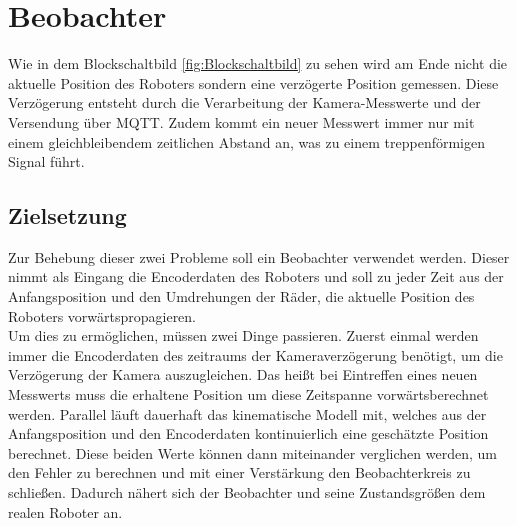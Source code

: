 \chapter{Beobachter}
Wie in dem Blockschaltbild \ref{fig:Blockschaltbild} zu sehen wird am Ende nicht die aktuelle Position des Roboters sondern eine verzögerte Position gemessen. Diese Verzögerung entsteht durch die Verarbeitung der Kamera-Messwerte und der Versendung über MQTT. Zudem kommt ein neuer Messwert immer nur mit einem gleichbleibendem zeitlichen Abstand an, was zu einem treppenförmigen Signal führt.

\section{Zielsetzung}
Zur Behebung dieser zwei Probleme soll ein Beobachter verwendet werden. Dieser nimmt als Eingang die Encoderdaten des Roboters und soll zu jeder Zeit aus der Anfangsposition und den Umdrehungen der Räder, die aktuelle Position des Roboters vorwärtspropagieren.\\
Um dies zu ermöglichen, müssen zwei Dinge passieren. Zuerst einmal werden immer die Encoderdaten des zeitraums der Kameraverzögerung benötigt, um die Verzögerung der Kamera auszugleichen. Das heißt bei Eintreffen eines neuen Messwerts muss die erhaltene Position um diese Zeitspanne vorwärtsberechnet werden. Parallel läuft dauerhaft das kinematische Modell mit, welches aus der Anfangsposition und den Encoderdaten kontinuierlich eine geschätzte Position berechnet. Diese beiden Werte können dann miteinander verglichen werden, um den Fehler zu berechnen und mit einer Verstärkung den Beobachterkreis zu schließen. Dadurch nähert sich der Beobachter und seine Zustandsgrößen dem realen Roboter an.
